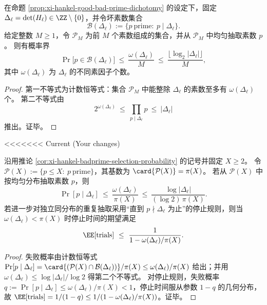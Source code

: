 \begin{corollary}\label{cor:xi-hankel-badprime-selection-probability}
在命题 \ref{prop:xi-hankel-good-bad-prime-dichotomy} 的设定下，固定 \(\Delta_\ell=\det(H_\ell)\in\ZZ\setminus\{0\}\)，并令坏素数集合
\[
\mathcal B(\Delta_\ell):=\{p\ \text{prime}:\ p\mid \Delta_\ell\}.
\]
给定整数 \(M\ge 1\)，令 \(\mathcal P_M\) 为前 \(M\) 个素数组成的集合，并从 \(\mathcal P_M\) 中均匀抽取素数 \(p\)。
则有概率界
\[
\Pr\bigl[p\in\mathcal B(\Delta_\ell)\bigr]
\ \le\ \frac{\omega(\Delta_\ell)}{M}
\ \le\ \frac{\lfloor \log_2|\Delta_\ell|\rfloor}{M},
\]
其中 \(\omega(\Delta_\ell)\) 为 \(\Delta_\ell\) 的不同素因子个数。
\end{corollary}
\begin{proof}
第一不等式为计数恒等式：集合 \(\mathcal P_M\) 中能整除 \(\Delta_\ell\) 的素数至多有 \(\omega(\Delta_\ell)\) 个。
第二不等式由
\[
2^{\omega(\Delta_\ell)}\ \le\ \prod_{p\mid \Delta_\ell}p\ \le\ |\Delta_\ell|
\]
推出。证毕。
\end{proof}

<<<<<<< Current (Your changes)
\begin{corollary}[有界素数集均匀抽取的失败概率与期望尝试次数]\label{cor:xi-hankel-badprime-selection-trials}
沿用推论 \ref{cor:xi-hankel-badprime-selection-probability} 的记号并固定 \(X\ge 2\)。
令 \(\mathcal P(X):=\{p\le X:\ p\ \text{prime}\}\)，其基数为 \(\card{\mathcal P(X)}=\pi(X)\)。
若从 \(\mathcal P(X)\) 中按均匀分布抽取素数 \(p\)，则
\[
\Pr[p\mid \Delta_\ell]
\ \le\
\frac{\omega(\Delta_\ell)}{\pi(X)}
\ \le\
\frac{\log|\Delta_\ell|}{(\log 2)\,\pi(X)}.
\]
若进一步对独立同分布的重复抽取采用“直到 \(p\nmid\Delta_\ell\) 为止”的停止规则，则当 \(\omega(\Delta_\ell)<\pi(X)\) 时停止时间的期望满足
\[
\EE[\mathrm{trials}]
\ \le\
\frac{1}{1-\omega(\Delta_\ell)/\pi(X)}.
\]
\end{corollary}
\begin{proof}
失败概率由计数恒等式
\(
\Pr[p\mid \Delta_\ell]=\card{(\mathcal P(X)\cap\mathcal B(\Delta_\ell))}/\pi(X)
\le \omega(\Delta_\ell)/\pi(X)
\)
给出；并用 \(\omega(\Delta_\ell)\le \log|\Delta_\ell|/\log 2\) 得第二个不等式。
对停止规则，失败概率 \(q:=\Pr[p\mid\Delta_\ell]\le \omega(\Delta_\ell)/\pi(X)<1\)，停止时间服从参数 \(1-q\) 的几何分布，故 \(\EE[\mathrm{trials}]=1/(1-q)\le 1/(1-\omega(\Delta_\ell)/\pi(X))\)。证毕。
\end{proof}

